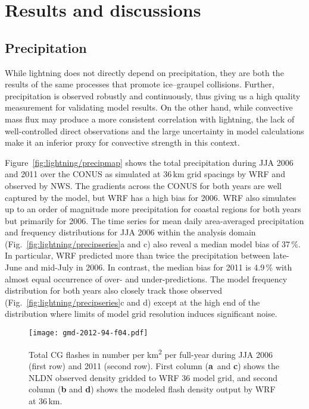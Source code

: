 \section{Results and discussions}\label{sec:lightning/results}

\subsection{Precipitation}\label{ssec:lightning/precip}

While lightning does not directly depend on precipitation, they are both the
results of the same processes that promote ice--graupel collisions. Further,
precipitation is observed robustly and continuously, thus giving us a high
quality measurement for validating model results. On the other hand, while
convective mass flux may produce a more consistent correlation with
lightning, the lack of well-controlled direct observations and the large
uncertainty in model calculations make it an inferior proxy for convective
strength in this context.

Figure~\ref{fig:lightning/precipmap} shows the total precipitation during JJA 2006 and
2011 over the CONUS as simulated at 36\,\unit{km} grid spacings by WRF and
observed by NWS. The gradients across the CONUS for both years are well
captured by the model, but WRF has a high bias for 2006. WRF also simulates
up to an order of magnitude more precipitation for coastal regions for both
years but primarily for 2006. The time series for mean daily area-averaged
precipitation and frequency distributions for JJA 2006 within the analysis
domain (Fig.~\ref{fig:lightning/precipseries}a and c) also reveal a median model bias
of 37\,{\%}. In particular, WRF predicted more than twice the precipitation
between late-June and mid-July in 2006. In contrast, the median bias for 2011
is 4.9\,{\%} with almost equal occurrence of over- and under-predictions. The
model frequency distribution for both years also closely track those observed
(Fig.~\ref{fig:lightning/precipseries}c and d) except at the high end of the
distribution where limits of model grid resolution induces significant noise.

\begin{figure*}[t]
      \texttt{[image: gmd-2012-94-f04.pdf]}
      \caption[Spatial distribution of NLDN and WRF-predicted CG flash counts]{Total CG flashes in number per \unit{km^2} per
          full-year during JJA 2006 (first row) and 2011 (second
          row). First column (\textbf{a}~and \textbf{c}) shows the NLDN observed
          density gridded to WRF 36 model grid, and second column
          (\textbf{b} and \textbf{d}) shows the modeled flash density output by
          WRF at 36\,\unit{km}.}
      \label{fig:lightning/cgmap}
\end{figure*}



